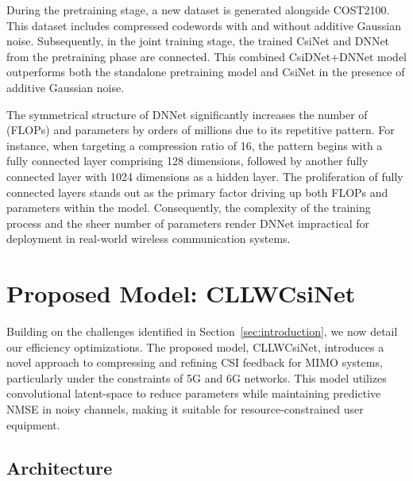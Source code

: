 \documentclass[lettersize,journal]{IEEEtran}
\begin{document}
During the pretraining stage, a new dataset is generated alongside COST2100. This dataset includes compressed codewords with and without additive Gaussian noise. Subsequently, in the joint training stage, the trained CsiNet and DNNet from the pretraining phase are connected. This combined CsiDNet+DNNet model outperforms both the standalone pretraining model and CsiNet in the presence of additive Gaussian noise. 

The symmetrical structure of DNNet significantly increases the number of (FLOPs) and parameters by orders of millions due to its repetitive pattern. For instance, when targeting a compression ratio of 16, the pattern begins with a fully connected layer comprising 128 dimensions, followed by another fully connected layer with 1024 dimensions as a hidden layer. The proliferation of fully connected layers stands out as the primary factor driving up both FLOPs and parameters within the model. Consequently, the complexity of the training process and the sheer number of parameters render DNNet impractical for deployment in real-world wireless communication systems.

\section{Proposed Model: CLLWCsiNet}
\label{sec:proposed_model}
Building on the challenges identified in Section~\ref{sec:introduction}, we now detail our efficiency optimizations.
The proposed model, CLLWCsiNet, introduces a novel approach to compressing and refining CSI feedback for MIMO systems, particularly under the constraints of 5G and 6G networks. This model utilizes convolutional latent-space to reduce parameters while maintaining predictive NMSE in noisy channels, making it suitable for resource-constrained user equipment.

\subsection{Architecture}
\end{document}
